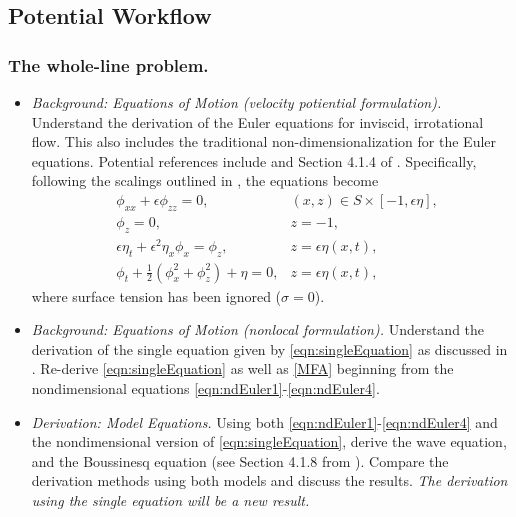 \documentclass[a4paper,reqno]{article}
\begin{document}
    \subsection{Potential Workflow}

        \subsubsection{The whole-line problem.}
        \begin{itemize}
            \item \textit{Background: Equations of Motion (velocity potiential formulation).} Understand the derivation of the Euler equations for inviscid, irrotational flow. This also includes the traditional non-dimensionalization for the Euler equations.                Potential references include \cite{johnson1997modern} and Section 4.1.4 of \cite{deconinckNotes}.  Specifically, following the scalings outlined in \cite{deconinckNotes}, the equations become
             \begin{align}
                &\phi_{xx}+\epsilon\phi_{zz}= 0,   &(x,z) \in S\times[-1,\epsilon\eta], \label{eqn:ndEuler1}\\
                &\phi_z = 0, &z= -1, \label{eqn:ndEuler2}\\
                &\epsilon\eta_t + \epsilon^2\eta_x\phi_x  = \phi_z, &z = \epsilon\eta(x,t), \label{eqn:ndEuler3}\\
                &\displaystyle\phi_t + \frac{1}{2}\left(\phi_{x}^2  + \phi_z^2\right) + \eta = 0,  &z = \epsilon\eta(x,t),\label{eqn:ndEuler4}
                \end{align}
                where surface tension has been ignored ($\sigma = 0$). 
            \item \textit{Background: Equations of Motion (nonlocal formulation).} Understand the derivation of the single equation given by \eqref{eqn:singleEquation} as discussed in \cite{oliverasNotesOneD}.  Re-derive \eqref{eqn:singleEquation} as well as \eqref{MFA} beginning from the nondimensional equations \eqref{eqn:ndEuler1}-\eqref{eqn:ndEuler4}.
            \item \textit{Derivation: Model Equations.}  Using both  \eqref{eqn:ndEuler1}-\eqref{eqn:ndEuler4} and the nondimensional version of \eqref{eqn:singleEquation}, derive the wave equation, and the Boussinesq equation (see Section 4.1.8 from \cite{deconinckNotes}).  Compare the derivation methods using both models and discuss the results.  \emph{The derivation using the single equation will be a new result. }
        \end{itemize}
\end{document}
